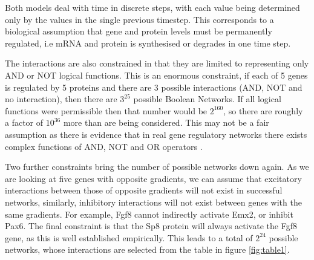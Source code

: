 \documentclass[a4paper,11pt]{article}
\begin{document}
Both models deal with time in discrete steps, with each value being determined only by the values in the single previous timestep. This corresponds to a biological assumption that gene and protein levels must be permanently regulated, i.e mRNA and protein is synthesised or degrades in one time step.\par

The interactions are also constrained in that they are limited to representing only AND or NOT  logical functions. This is an enormous constraint, if each of 5 genes is regulated by 5 proteins and there are 3 possible interactions (AND, NOT and no interaction), then there are $3^{25}$ possible Boolean Networks. If all logical functions were permissible then that number would be $2^{160}$, so there are roughly a factor of $10^{36}$ more than are being considered. This may not be a fair assumption as there is evidence that in real gene regulatory networks there exists complex functions of AND, NOT and OR operators \citep{Alon2007}.\par

Two further constraints bring the number of possible networks down again. As we are looking at five genes with opposite gradients, we can assume that excitatory interactions between those of opposite gradients will not exist in successful networks, similarly, inhibitory interactions will not exist between genes with the same gradients. For example, Fgf8 cannot indirectly activate Emx2, or inhibit Pax6. The final constraint is that the Sp8 protein will always activate the Fgf8 gene, as this is well established empirically. This leads to a total of $2^{24}$ possible networks, whose interactions are selected from the table in figure \ref{fig:table1}.\par
\end{document}

